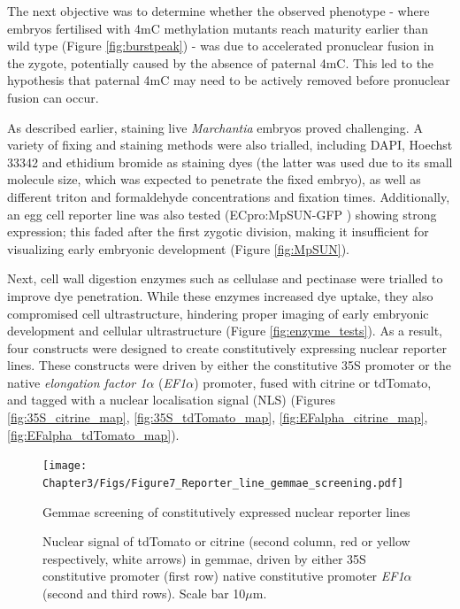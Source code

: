 The next objective was to determine whether the observed phenotype - where embryos fertilised with 4mC methylation mutants reach maturity earlier than wild type (Figure \ref{fig:burstpeak}) - was due to accelerated pronuclear fusion in the zygote, potentially caused by the absence of paternal 4mC. This led to the hypothesis that paternal 4mC may need to be actively removed before pronuclear fusion can occur.

As described earlier, staining live \textit{Marchantia} embryos proved challenging. A variety of fixing and staining methods were also trialled, including DAPI, Hoechst 33342 and ethidium bromide as staining dyes (the latter was used due to its small molecule size, which was expected to penetrate the fixed embryo), as well as different triton and formaldehyde concentrations and fixation times. Additionally, an egg cell reporter line was also tested (ECpro:MpSUN-GFP \cite{RN139}) showing strong expression; this faded after the first zygotic division, making it insufficient for visualizing early embryonic development (Figure \ref{fig:MpSUN}). 

Next, cell wall digestion enzymes such as cellulase and pectinase were trialled to improve dye penetration. While these enzymes increased dye uptake, they also compromised cell ultrastructure, hindering proper imaging of early embryonic development and cellular ultrastructure (Figure \ref{fig:enzyme_tests}). As a result, four constructs were designed to create constitutively expressing nuclear reporter lines. These constructs were driven by either the constitutive 35S promoter or the native \textit{elongation factor 1$\alpha$} (\textit{EF1$\alpha$}) promoter, fused with citrine or tdTomato, and tagged with a nuclear localisation signal (NLS) (Figures \ref{fig:35S_citrine_map}, \ref{fig:35S_tdTomato_map}, \ref{fig:EFalpha_citrine_map}, \ref{fig:EFalpha_tdTomato_map}). 

\begin{figure}[htbp!] 
\centering    
    \texttt{[image: Chapter3/Figs/Figure7\_Reporter\_line\_gemmae\_screening.pdf]}
\caption{Gemmae screening of constitutively expressed nuclear reporter lines}
\label{fig:gemma:screen}
\captionsetup{font=small}
    \caption*{Nuclear signal of tdTomato or citrine (second column, red or yellow respectively, white arrows) in gemmae, driven by either 35S constitutive promoter (first row) native constitutive promoter \textit{EF1$\alpha$} (second and third rows). Scale bar 10$\mu$m.}
\end{figure}

